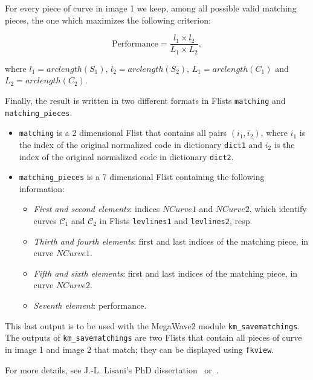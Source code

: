For every piece of curve in image 1 we keep, among all possible valid
matching pieces, the one which maximizes the following criterion:

$$\mbox{Performance} = \frac{l_1 \times l_2}{L_1 \times L_2},$$

where $l_1=arclength(S_1)$, $l_2=arclength(S_2)$, $L_1=arclength(C_1)$
and $L_2=arclength(C_2)$.

Finally, the result is written in two different formats in Flists
\verb+matching+ and \verb+matching_pieces+. 

\begin{itemize}

\item \verb+matching+ is a 2 dimensional Flist that contains all pairs
$(i_1,i_2)$, where $i_1$ is the index of the original normalized code
in dictionary \verb+dict1+ and $i_2$ is the index of the original
normalized code in dictionary \verb+dict2+.

\item \verb+matching_pieces+ is a 7 dimensional Flist containing the
  following information:

  \begin{itemize}

  \item {\em First and second elements}: indices $NCurve1$ and
    $NCurve2$, which identify curves ${\mathcal C}_1$ and ${\mathcal C}_2$
    in Flists \verb+levlines1+ and \verb+levlines2+, resp.
  
  \item {\em Thirth and fourth elements}: first and last indices of the
    matching piece, in curve $NCurve1$.

  \item {\em Fifth and sixth elements}: first and last indices of the
    matching piece, in curve $NCurve2$.

  \item {\em Seventh element}: performance.
    
  \end{itemize}

\end{itemize}

This last output is to be used with the MegaWave2
module \verb+km_savematchings+. The
outputs of \verb+km_savematchings+ are two Flists that contain all pieces of
curve in image 1 and image 2 that match; they can be displayed using
\verb+fkview+.

\medskip

For more details, see J.-L. Lisani's PhD dissertation~\cite{lisani:comparaison} 
or~\cite{lisani.monasse.ea:on}.

